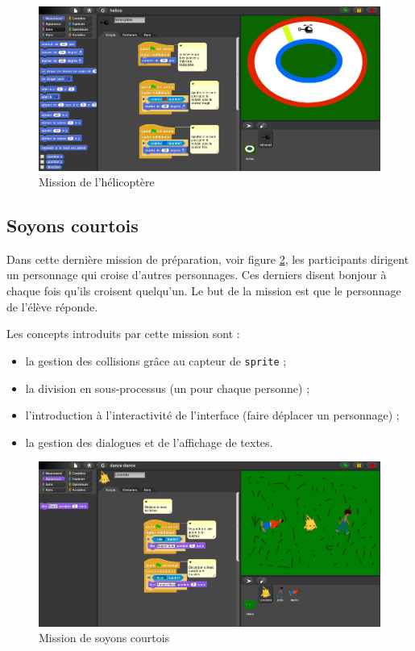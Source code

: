 \begin{figure}
  \begin{center}
    \includegraphics[width=\textwidth]{content/7-solution/1-missions/images/helicoptere}
    \caption{Mission de l'hélicoptère}
    \label{fig:mission-hélicoptère}
  \end{center}
\end{figure}

\subsection{Soyons courtois}
\label{mission-courtois}
Dans cette dernière \gls{mission} de préparation, voir figure \ref{fig:courtois}, les participants dirigent un personnage qui croise d'autres personnages. Ces derniers disent bonjour à chaque fois qu'ils croisent quelqu'un. Le but de la \gls{mission} est que le personnage de l'élève réponde.

Les concepts introduits par cette \gls{mission} sont :
\begin{itemize}
\item la gestion des collisions grâce au capteur de \texttt{sprite} ;
\item la division en sous-processus (un pour chaque personne) ;
\item l'introduction à l'interactivité de l'interface (faire déplacer un personnage) ;
\item la gestion des dialogues et de l'affichage de textes.
\end{itemize}

\begin{figure}
  \begin{center}
    \includegraphics[width=\textwidth]{content/7-solution/1-missions/images/courtois}
    \caption{Mission de soyons courtois}
    \label{fig:courtois}
  \end{center}
\end{figure}

